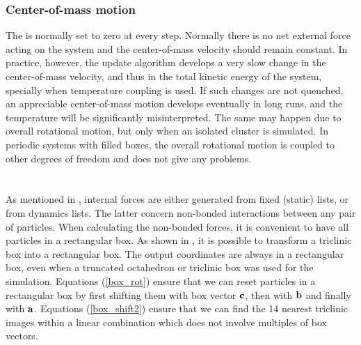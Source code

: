 \subsubsection*{Center-of-mass motion}
The  is normally set to zero at
every step.  Normally there is no net external force acting on the
system and the center-of-mass velocity should remain constant. In
practice, however, the update algorithm develops a very slow change in
the center-of-mass velocity, and thus in the total kinetic energy of
the system, specially when temperature coupling is used. If such
changes are not quenched, an appreciable center-of-mass motion
develops eventually in long runs, and the temperature will be
significantly misinterpreted. The same may happen due to overall
rotational motion, but only when an isolated cluster is simulated. In
periodic systems with filled boxes, the overall rotational motion is
coupled to other degrees of freedom and does not give any problems.


\section{}
\label{sec:ns}
As mentioned in , internal forces are
either generated from fixed (static) lists, or from dynamics lists.
The latter concern non-bonded interactions between any pair of particles.
When calculating the non-bonded forces, it is convenient to have all
particles in a rectangular box.
As shown in , it is possible to transform a
triclinic box into a rectangular box.
The output coordinates are always in a rectangular box, even when a
truncated octahedron or triclinic box was used for the simulation.
Equations (\ref{box_rot}) ensure
that we can reset particles in a rectangular box by first shifting them with
box vector ${\bf c}$, then with ${\bf b}$ and finally with ${\bf a}$.
Equations (\ref{box_shift2}) ensure that we can find the 14 nearest 
triclinic images within a linear combination which does not involve
multiples of box vectors.

